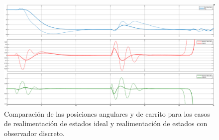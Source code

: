 \begin{figure}[H]
	\centering
	\includegraphics[width=\linewidth]{../Analisis de Resultados/ImagenesAnalisis de Resultados/disc_vs_ideal_vars.png}
	\caption{Comparación de las posiciones angulares y de carrito para los casos de realimentación de estados ideal y realimentación de estados con observador discreto.}	
	\label{fig:disc_vs_ideal_vars}
\end{figure}


